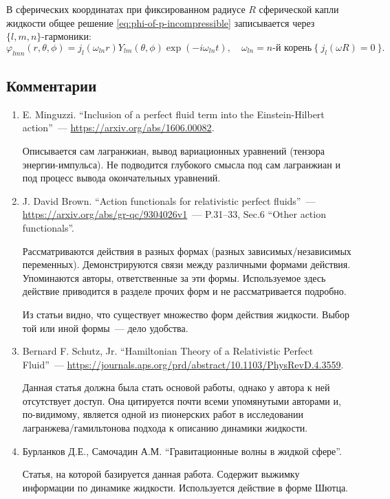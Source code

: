 \documentclass[\docroot/reports/draft/report.tex]{subfiles}
\begin{document}
    В сферических координатах при фиксированном радиусе $R$ сферической капли жидкости общее решение \autoref{eq:phi-of-p-incompressible} записывается через $\{l,m,n\}$-гармоники:
    \begin{equation*}
        \varphi_{lmn}(r,\theta,\phi) =
            j_l(\omega_{ln} r) Y_{lm}(\theta,\phi) \exp(-i \omega_{ln} t) , \quad
        \omega_{ln} = \text{$n$-й корень}\ \{\ j_l(\omega R) = 0\ \} .
    \end{equation*}

\subsection{Комментарии}

    \begin{enumerate}
        \item E. Minguzzi. \enquote{Inclusion of a perfect fluid term into the Einstein-Hilbert action}~--- \url{https://arxiv.org/abs/1606.00082}.

        Описывается сам лагранжиан, вывод вариационных уравнений (тензора энергии-импульса). Не подводится глубокого смысла под сам лагранжиан и под процесс вывода окончательных уравнений.

        \item J. David Brown. \enquote{Action functionals for relativistic perfect fluids}~--- \url{https://arxiv.org/abs/gr-qc/9304026v1}~--- P.31--33, Sec.6 \enquote{Other action functionals}.

        Рассматриваются действия в разных формах (разных зависимых/независимых переменных). Демонстрируются связи между различными формами действия. Упоминаются авторы, ответственные за эти формы. Используемое здесь действие приводится в разделе прочих форм и не рассматривается подробно.

        Из статьи видно, что существует множество форм действия жидкости. Выбор той или иной формы~--- дело удобства.

        \item Bernard F. Schutz, Jr. \enquote{Hamiltonian Theory of a Relativistic Perfect Fluid}~--- \url{https://journals.aps.org/prd/abstract/10.1103/PhysRevD.4.3559}.

        Данная статья должна была стать основой работы, однако у автора к ней отсутствует доступ. Она цитируется почти всеми упомянутыми авторами и, по-видимому, является одной из пионерских работ в исследовании лагранжева/гамильтонова подхода к описанию динамики жидкости.

        \item Бурланков Д.Е., Самочадин А.М. \enquote{Гравитационные волны в жидкой сфере}.

        Статья, на которой базируется данная работа. Содержит выжимку информации по динамике жидкости. Используется действие в форме Шютца.
    \end{enumerate}

\end{document}
